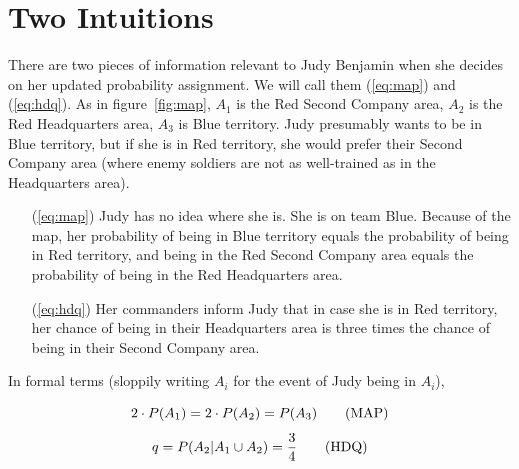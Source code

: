 \documentclass[12pt]{article}
\begin{document}
\section{Two Intuitions}
\label{sec:2}

\nias There are two pieces of information relevant to Judy Benjamin
when she decides on her updated probability assignment. We will call
them ({\ref{eq:map}}) and ({\ref{eq:hdq}}). As in
figure~\ref{fig:map}, $A_{1}$ is the Red Second Company area, $A_{2}$ is
the Red Headquarters area, $A_{3}$ is Blue territory. Judy presumably
wants to be in Blue territory, but if she is in Red territory, she
would prefer their Second Company area (where enemy soldiers are not
as well-trained as in the Headquarters area).

\begin{enumerate}
\item[({\ref{eq:map}})] Judy has no idea where she is. She is on team Blue.
  Because of the map, her probability of being in Blue territory
  equals the probability of being in Red territory, and being in the Red
  Second Company area equals the probability of being in the Red
  Headquarters area.
\item[({\ref{eq:hdq}})] Her commanders inform Judy that in case she is in Red
  territory, her chance of being in their Headquarters area is three
  times the chance of being in their Second Company area.
\end{enumerate}

\nial In formal terms (sloppily writing $A_{i}$ for the event of Judy
being in $A_{i}$),

\begin{equation}
  \label{eq:map}
  2\cdot{}P(A_{1})=2\cdot{}P(A_{2})=P(A_{3})\tag{\mbox{MAP}}
\end{equation}
\begin{equation}
  \label{eq:hdq}
  q=P(A_{2}|A_{1}\cup{}A_{2})=\frac{3}{4}\tag{\mbox{HDQ}}
\end{equation}
\end{document}
